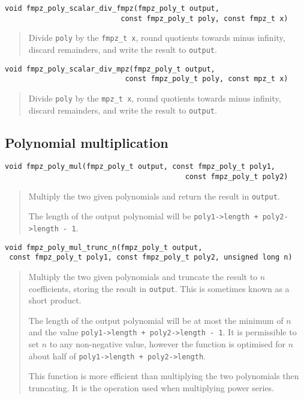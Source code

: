 \documentclass[a4paper,10pt]{article}
\newcommand{\code}{\lstinline}
\begin{document}
\begin{lstlisting}
void fmpz_poly_scalar_div_fmpz(fmpz_poly_t output, 
                           const fmpz_poly_t poly, const fmpz_t x) 
\end{lstlisting}
\begin{quote}
Divide \code{poly} by the \code{fmpz_t x}, round quotients towards minus infinity, discard remainders, and write the result to \code{output}. 
\end{quote}

\begin{lstlisting}
void fmpz_poly_scalar_div_mpz(fmpz_poly_t output, 
                            const fmpz_poly_t poly, const mpz_t x) 
\end{lstlisting}
\begin{quote}
Divide \code{poly} by the \code{mpz_t x}, round quotients towards minus infinity, discard remainders, and write the result to \code{output}. 
\end{quote}

\subsection{Polynomial multiplication}

\begin{lstlisting}
void fmpz_poly_mul(fmpz_poly_t output, const fmpz_poly_t poly1, 
                                          const fmpz_poly_t poly2) 
\end{lstlisting}
\begin{quote}
Multiply the two given polynomials and return the result in \code{output}.

The length of the output polynomial will be \code{poly1->length + poly2->length - 1}.
\end{quote}

\begin{lstlisting}
void fmpz_poly_mul_trunc_n(fmpz_poly_t output, 
 const fmpz_poly_t poly1, const fmpz_poly_t poly2, unsigned long n) 
\end{lstlisting}
\begin{quote}
Multiply the two given polynomials and truncate the result to $n$ coefficients, storing the result in \code{output}. This is sometimes known as a short product.

The length of the output polynomial will be at most the minimum of $n$ and the value \code{poly1->length + poly2->length - 1}. It is permissible to set $n$ to any non-negative value, however the function is optimised for $n$ about half of \code{poly1->length + poly2->length}.

This function is more efficient than multiplying the two polynomials then truncating. It is the operation used when multiplying power series.
\end{quote}
\end{document}
